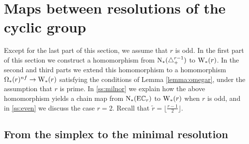 
\section{Maps between resolutions of the cyclic group}\label{s:resolutions}

Except for the last part of this section, we assume that $r$ is odd. In the first part of this section we construct a homomorphism from $\operatorname{N}_{*}(\triangle_{+}^{r-1})$ to $\operatorname{W}_{*}(r)$. In the second and third parts we extend this homomorphism to a homomorphism $\Omega_*(r)^{nf} \to \operatorname{W}_{*}(r)$ satisfying the conditions of Lemma \ref{lemma:omegar}, under the assumption that $r$ is prime. In \cref{ss:milnor} we explain how the above homomorphism yields a chain map from $\operatorname{N}_{*}(\mathrm{E}\mathbb{C}_r)$ to $\operatorname{W}_{*}(r)$ when $r$ is odd, and in \cref{ss:even} we discuss the case $r=2$. Recall that $\tilde{r} = \lfloor \frac{r-1}{2}\rfloor$.

\subsection{From the simplex to the minimal resolution}

